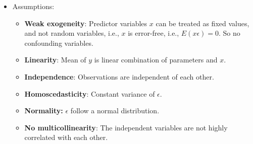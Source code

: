\documentclass[../ds]{subfiles}
\begin{document}
\begin{itemize}
\item 
Assumptions:
	\begin{itemize}
	\item \textbf{Weak exogeneity}: Predictor variables $x$ can be treated as fixed values, and not random variables, i.e., $x$ is error-free, i.e., $E(x\epsilon) = 0.$ So no confounding variables.
	
	\item \textbf{Linearity}: Mean of $y$ is linear combination of parameters and $x.$
	
	\item \textbf{Independence}: Observations are independent of each other.
		
	\item \textbf{Homoscedasticity}: Constant variance of $\epsilon.$
	
	\item \textbf{Normality:} $\epsilon$ follow a normal distribution.
	
	\item \textbf{No multicollinearity}: The independent variables are not highly correlated with each other.
	\end{itemize}

\end{itemize}
\end{document}
